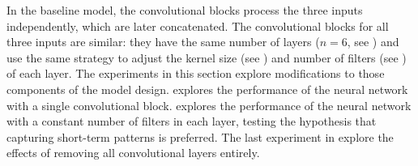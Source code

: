 
In the baseline model, the convolutional blocks process the
three inputs independently, which are later concatenated.
The convolutional blocks for all three inputs are similar:
they have the same number of layers ($n=6$, see
) and use the
same strategy to adjust the kernel size (see
) and number of filters (see
) of each layer. The
experiments in this section explore modifications to those
components of the model design.
 explores the
performance of the neural network with a single
convolutional block. 
explores the performance of the neural network with a
constant number of filters in each layer, testing the
hypothesis that capturing short-term patterns is preferred.
The last experiment in 
explore the effects of removing all convolutional layers
entirely.
